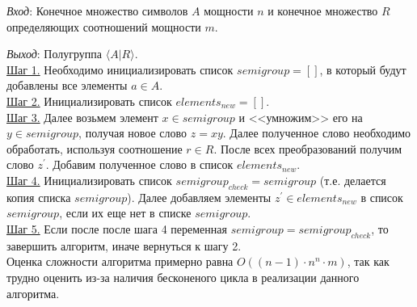 \documentclass[bachelor, och, labwork]{shiza}
\begin{document}
        \textit{Вход}: Конечное множество символов $A$ мощности $n$ и конечное множество $R$ определяющих соотношений мощности $m$.

        \textit{Выход}: Полугруппа $\langle A | R \rangle$.\\
        \underline{Шаг 1.} Необходимо инициализировать список $semigroup = []$, в который будут добавлены все элементы $a \in A$.\\
        \underline{Шаг 2.} Инициализировать список $elements_{new} = []$.\\
        \underline{Шаг 3.} Далее возьмем элемент $x \in semigroup$ и <<умножим>> его на $y \in semigroup$, получая новое слово
        $z = xy$. Далее полученное слово необходимо обработать, используя соотношение $r \in R$. После всех преобразований получим слово $z^{'}$.
        Добавим полученное слово в список $elements_{new}$.\\
        \underline{Шаг 4.} Инициализировать список $semigroup_{check} = semigroup$ (т.е. делается копия списка $semigroup$). Далее добавляем
        элементы $z^{'} \in elements_{new}$ в список $semigroup$, если их еще нет в списке $semigroup$. \\
        \underline{Шаг 5.} Если после после шага 4 переменная $semigroup = semigroup_{check}$, то завершить алгоритм, иначе вернуться к шагу 2. \\

        Оценка сложности алгоритма примерно равна $O((n - 1) \cdot n^n \cdot m)$, так как трудно оценить из-за наличия бесконеного цикла в реализации
        данного алгоритма.\\

\end{document}
